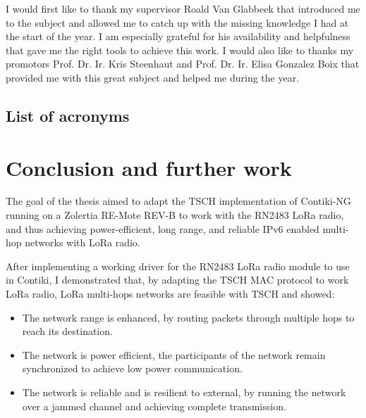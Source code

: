 \documentclass[11pt]{report}
\begin{document}
I would first like to thank my supervisor Roald Van Glabbeek that introduced me
to the subject and allowed me to catch up with the missing knowledge I had at
the start of the year.
I am especially grateful for his availability and helpfulness that gave me the
right tools to achieve this work.
I would also like to thanks my promotors Prof. Dr. Ir. Kris Steenhaut and Prof.
Dr. Ir. Elisa Gonzalez Boix that provided me with this great subject and helped me
during the year.


\newpage

\tableofcontents

\newpage

\listoffigures

\newpage

\section*{List of acronyms}



\newpage










\chapter{Conclusion and further work\label{section:conclusion}}

The goal of the thesis aimed to adapt the TSCH implementation of Contiki-NG
running on a Zolertia RE-Mote REV-B to work with the RN2483 LoRa radio,
and thus achieving power-efficient, long range, and reliable IPv6 enabled
multi-hop networks with LoRa radio.

After implementing a working driver for the RN2483 LoRa radio module to use
in Contiki, I demonstrated that, by adapting the TSCH MAC protocol to work
LoRa radio, LoRa multi-hops networks are feasible with TSCH and showed:

\begin{itemize}
  \item The network range is enhanced, by routing packets through multiple hops to reach
    its destination.
  \item The network is power efficient, the participants of the network remain synchronized
    to achieve low power communication.
  \item The network is reliable and is resilient to external, by running the network
    over a jammed channel and achieving complete transmission.
\end{itemize}
\end{document}
